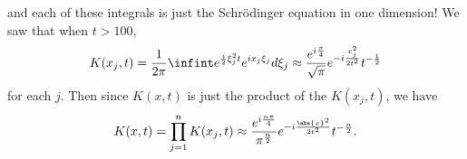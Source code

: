 and each of these integrals is just the Schr{\"o}dinger equation in one dimension! We saw that when $t > 100$, 
\[
	K(x_j, t) = \frac{1}{2\pi} \infint e^{\frac{i}{2}\xi_j^2 t}e^{ix_j\xi_j}d\xi_j \approx \frac{e^{i\frac{\pi}{4}}}{\sqrt{\pi}}e^{-i\frac{x_j^2}{2t^2}}t^{-\frac{1}{2}}
\]
for each $j$. Then since $K(x, t)$ is just the product of the $K(x_j, t)$, we have
\begin{equation}
	K(x, t) = \prod_{j=1}^n K(x_j, t) \approx \frac{e^{i\frac{n\pi}{4}}}{\pi^\frac{n}{2}}e^{-i\frac{\abs{x}^2}{2t^2}}t^{-\frac{n}{2}}.
\end{equation}